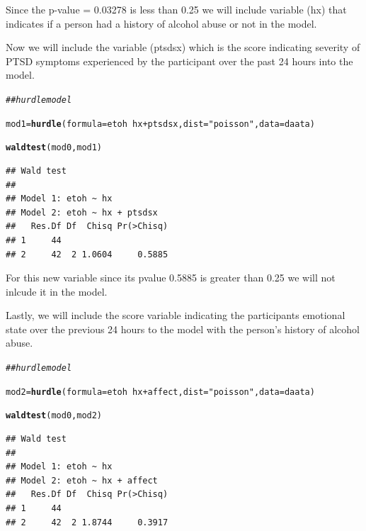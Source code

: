 \documentclass{article}\usepackage[]{graphicx}\usepackage[]{color}
\makeatletter
\newcommand{\hlstr}[1]{\textcolor[rgb]{0.192,0.494,0.8}{#1}}%
\newcommand{\hlcom}[1]{\textcolor[rgb]{0.678,0.584,0.686}{\textit{#1}}}%
\newcommand{\hlopt}[1]{\textcolor[rgb]{0,0,0}{#1}}%
\newcommand{\hlstd}[1]{\textcolor[rgb]{0.345,0.345,0.345}{#1}}%
\newcommand{\hlkwb}[1]{\textcolor[rgb]{0.69,0.353,0.396}{#1}}%
\newcommand{\hlkwc}[1]{\textcolor[rgb]{0.333,0.667,0.333}{#1}}%
\newcommand{\hlkwd}[1]{\textcolor[rgb]{0.737,0.353,0.396}{\textbf{#1}}}%
\newenvironment{kframe}{%
 \def\at@end@of@kframe{}%
 \ifinner\ifhmode%
  \def\at@end@of@kframe{\end{minipage}}%
  \begin{minipage}{\columnwidth}%
 \fi\fi%
 \def\FrameCommand##1{\hskip\@totalleftmargin \hskip-\fboxsep
 \colorbox{shadecolor}{##1}\hskip-\fboxsep
     \hskip-\linewidth \hskip-\@totalleftmargin \hskip\columnwidth}%
 \MakeFramed {\advance\hsize-\width
   \@totalleftmargin\z@ \linewidth\hsize
   \@setminipage}}%
 {\par\unskip\endMakeFramed%
 \at@end@of@kframe}
\newenvironment{knitrout}{}{} %
\makeatother
\begin{document}
Since the p-value = 0.03278 is less than 0.25 we will include variable (hx) that indicates if a person had a history of alcohol abuse or not in the model. 

\vspace{5mm}

Now we will include the variable (ptsdsx) which is the score indicating severity of PTSD symptoms experienced by the participant over the past 24 hours into the model. 

\begin{knitrout}
\color{fgcolor}\begin{kframe}
\begin{alltt}
\hlcom{## hurdle model}

\hlstd{mod1} \hlkwb{=} \hlkwd{hurdle}\hlstd{(}\hlkwc{formula} \hlstd{= etoh} \hlopt{~} \hlstd{hx} \hlopt{+} \hlstd{ptsdsx,} \hlkwc{dist} \hlstd{=} \hlstr{"poisson"}\hlstd{,} \hlkwc{data} \hlstd{= daata)}

\hlkwd{waldtest}\hlstd{(mod0, mod1)}
\end{alltt}
\begin{verbatim}
## Wald test
## 
## Model 1: etoh ~ hx
## Model 2: etoh ~ hx + ptsdsx
##   Res.Df Df  Chisq Pr(>Chisq)
## 1     44                     
## 2     42  2 1.0604     0.5885
\end{verbatim}
\end{kframe}
\end{knitrout}

For this new variable since its pvalue 0.5885 is greater than 0.25 we will not inlcude it in the model. 

\vspace{5mm}

Lastly, we will include the score variable indicating the participants emotional state over the previous 24 hours to the model with the person's history of alcohol abuse. 

\begin{knitrout}
\color{fgcolor}\begin{kframe}
\begin{alltt}
\hlcom{## hurdle model}

\hlstd{mod2} \hlkwb{=} \hlkwd{hurdle}\hlstd{(}\hlkwc{formula} \hlstd{= etoh} \hlopt{~} \hlstd{hx} \hlopt{+} \hlstd{affect,} \hlkwc{dist} \hlstd{=} \hlstr{"poisson"}\hlstd{,} \hlkwc{data} \hlstd{= daata)}

\hlkwd{waldtest}\hlstd{(mod0, mod2)}
\end{alltt}
\begin{verbatim}
## Wald test
## 
## Model 1: etoh ~ hx
## Model 2: etoh ~ hx + affect
##   Res.Df Df  Chisq Pr(>Chisq)
## 1     44                     
## 2     42  2 1.8744     0.3917
\end{verbatim}
\end{kframe}
\end{knitrout}
\end{document}
